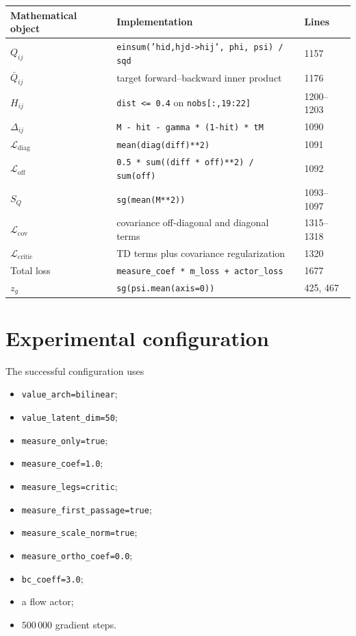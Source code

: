 \documentclass[11pt]{article}
\theoremstyle{remark}
\begin{document}
\begin{center}
\footnotesize
\setlength{\tabcolsep}{4pt}
\begin{tabular}{@{}lll@{}}
\toprule
Mathematical object & Implementation & Lines \\
\midrule
$Q_{ij}$ & \texttt{einsum('hid,hjd->hij', phi, psi) / sqd} & 1157 \\
$\bar Q_{ij}$ & target forward--backward inner product & 1176 \\
$H_{ij}$ & \texttt{dist <= 0.4} on \texttt{nobs[:,19:22]} & 1200--1203 \\
$\Delta_{ij}$ & \texttt{M - hit - gamma * (1-hit) * tM} & 1090 \\
$\mathcal L_{\mathrm{diag}}$ & \texttt{mean(diag(diff)**2)} & 1091 \\
$\mathcal L_{\mathrm{off}}$ & \texttt{0.5 * sum((diff * off)**2) / sum(off)} & 1092 \\
$S_Q$ & \texttt{sg(mean(M**2))} & 1093--1097 \\
$\mathcal L_{\mathrm{cov}}$ & covariance off-diagonal and diagonal terms & 1315--1318 \\
$\mathcal L_{\mathrm{critic}}$ & TD terms plus covariance regularization & 1320 \\
Total loss & \texttt{measure\_coef * m\_loss + actor\_loss} & 1677 \\
$z_g$ & \texttt{sg(psi.mean(axis=0))} & 425, 467 \\
\bottomrule
\end{tabular}
\end{center}

\section{Experimental configuration}

The successful configuration uses

\begin{itemize}[leftmargin=1.5em]
\item \texttt{value\_arch=bilinear};
\item \texttt{value\_latent\_dim=50};
\item \texttt{measure\_only=true};
\item \texttt{measure\_coef=1.0};
\item \texttt{measure\_legs=critic};
\item \texttt{measure\_first\_passage=true};
\item \texttt{measure\_scale\_norm=true};
\item \texttt{measure\_ortho\_coef=0.0};
\item \texttt{bc\_coeff=3.0};
\item a flow actor;
\item $500\,000$ gradient steps.
\end{itemize}
\end{document}
